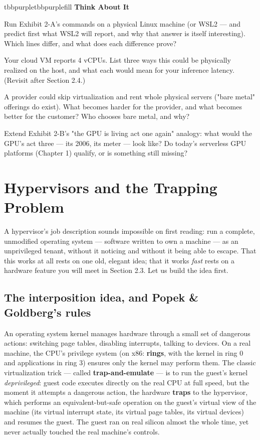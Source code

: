 \begin{calloutbox}{tbbpurple}{tbbpurplefill}
{\normalsize\bfseries\color{tbbpurple}Think About It}\par\vspace{3pt}
\begin{tbbitemize}
  \item Run Exhibit 2-A's commands on a physical Linux machine (or WSL2 — and predict first what WSL2 will report, and why that answer is itself interesting). Which lines differ, and what does each difference prove?
  \item Your cloud VM reports 4 vCPUs. List three ways this could be physically realized on the host, and what each would mean for your inference latency. (Revisit after Section 2.4.)
  \item A provider could skip virtualization and rent whole physical servers ("bare metal" offerings do exist). What becomes harder for the provider, and what becomes better for the customer? Who chooses bare metal, and why?
  \item Extend Exhibit 2-B's "the GPU is living act one again" analogy: what would the GPU's act three — its 2006, its meter — look like? Do today's serverless GPU platforms (Chapter 1) qualify, or is something still missing?
\end{tbbitemize}
\end{calloutbox}

\section{Hypervisors and the Trapping Problem}

A hypervisor's job description sounds impossible on first reading: run a complete, unmodified operating system — software written to own a machine — as an unprivileged tenant, without it noticing and without it being able to escape. That this works at all rests on one old, elegant idea; that it works \textit{fast} rests on a hardware feature you will meet in Section 2.3. Let us build the idea first.

\subsection*{The interposition idea, and Popek \& Goldberg's rules}

An operating system kernel manages hardware through a small set of dangerous actions: switching page tables, disabling interrupts, talking to devices. On a real machine, the CPU's privilege system (on x86: \textbf{rings}, with the kernel in ring 0 and applications in ring 3) ensures only the kernel may perform them. The classic virtualization trick — called \textbf{trap-and-emulate} — is to run the guest's kernel \textit{deprivileged}: guest code executes directly on the real CPU at full speed, but the moment it attempts a dangerous action, the hardware \textbf{traps} to the hypervisor, which performs an equivalent-but-safe operation on the guest's virtual view of the machine (its virtual interrupt state, its virtual page tables, its virtual devices) and resumes the guest. The guest ran on real silicon almost the whole time, yet never actually touched the real machine's controls.

